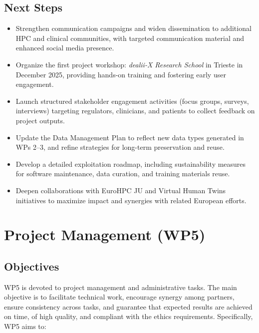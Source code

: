 \documentclass[a4paper,12pt, numbers]{article}
\begin{document}
\subsection{Next Steps} %

\begin{itemize}[left=1em, itemsep=0pt, topsep=0pt]
\item Strengthen communication campaigns and widen dissemination to additional HPC and clinical communities, with targeted communication material and enhanced social media presence.
\item Organize the first project workshop: \textit{dealii-X Research School} in Trieste in December 2025, providing hands-on training and fostering early user engagement.
\item Launch structured stakeholder engagement activities (focus groups, surveys, interviews) targeting regulators, clinicians, and patients to collect feedback on project outputs.
\item Update the Data Management Plan to reflect new data types generated in WPs 2–3, and refine strategies for long-term preservation and reuse.
\item Develop a detailed exploitation roadmap, including sustainability measures for software maintenance, data curation, and training materials reuse.
\item Deepen collaborations with EuroHPC JU and Virtual Human Twins initiatives to maximize impact and synergies with related European efforts.
\end{itemize}






\newpage

\section{{Project Management (WP5)}}
\label{sec:wp5_management}

\subsection{Objectives}

WP5 is devoted to project management and administrative tasks. The main objective is to facilitate technical work, encourage synergy among partners, ensure consistency across tasks, and guarantee that expected results are achieved on time, of high quality, and compliant with the ethics requirements. Specifically, WP5 aims to:
\end{document}
